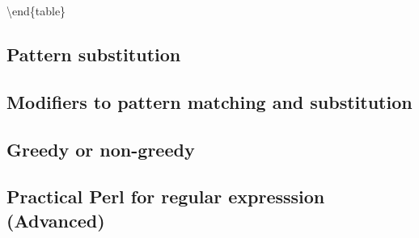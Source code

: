 \documentclass[]{book}
\makeatletter
\newenvironment{Shaded}{\begin{snugshade}}{\end{snugshade}}
\newcommand{\CharTok}[1]{\textcolor[rgb]{0.31,0.60,0.02}{#1}}
\newcommand{\CommentTok}[1]{\textcolor[rgb]{0.56,0.35,0.01}{\textit{#1}}}
\newcommand{\DataTypeTok}[1]{\textcolor[rgb]{0.13,0.29,0.53}{#1}}
\newcommand{\FunctionTok}[1]{\textcolor[rgb]{0.00,0.00,0.00}{#1}}
\newcommand{\KeywordTok}[1]{\textcolor[rgb]{0.13,0.29,0.53}{\textbf{#1}}}
\newcommand{\NormalTok}[1]{#1}
\newcommand{\OtherTok}[1]{\textcolor[rgb]{0.56,0.35,0.01}{#1}}
\newcommand{\StringTok}[1]{\textcolor[rgb]{0.31,0.60,0.02}{#1}}
\newenvironment{kframe}{%
\medskip{}
\setlength{\fboxsep}{.8em}
 \def\at@end@of@kframe{}%
 \ifinner\ifhmode%
  \def\at@end@of@kframe{\end{minipage}}%
  \begin{minipage}{\columnwidth}%
 \fi\fi%
 \def\FrameCommand##1{\hskip\@totalleftmargin \hskip-\fboxsep
 \colorbox{shadecolor}{##1}\hskip-\fboxsep
     \hskip-\linewidth \hskip-\@totalleftmargin \hskip\columnwidth}%
 \MakeFramed {\advance\hsize-\width
   \@totalleftmargin\z@ \linewidth\hsize
   \@setminipage}}%
 {\par\unskip\endMakeFramed%
 \at@end@of@kframe}
\renewenvironment{Shaded}{\begin{kframe}}{\end{kframe}}
\makeatother
\begin{document}
\textbackslash{}end\{table\}

\hypertarget{pattern-substitution}{%
\subsection{Pattern substitution}\label{pattern-substitution}}

\hypertarget{modifiers-to-pattern-matching-and-substitution}{%
\subsection{Modifiers to pattern matching and substitution}\label{modifiers-to-pattern-matching-and-substitution}}

\hypertarget{greedy-or-non-greedy}{%
\subsection{Greedy or non-greedy}\label{greedy-or-non-greedy}}

\hypertarget{practical-perl-for-regular-expresssion-advanced}{%
\subsection{Practical Perl for regular expresssion (Advanced)}\label{practical-perl-for-regular-expresssion-advanced}}

\begin{Shaded}
\end{Shaded}
\end{document}
